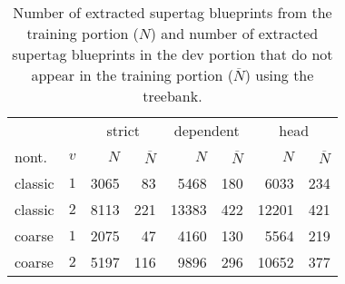\documentclass[../../document.tex]{subfiles}
\begin{document}
    \subsection{}
    \begin{table}
        \caption{\label{tbl:experiments:tiger:size}
        Number of extracted supertag blueprints from the training portion ($N$) and number of extracted supertag blueprints in the dev portion that do not appear in the training portion ($\overline{N}$) using the \tiger{} treebank.
        }
        \centering
        \setlength{\tabcolsep}{4pt}
        \vspace{.2cm}
        \begin{tabular}{lc|rr|rr|rr}
            \toprule     
            &        & \multicolumn{2}{c|}{strict} & \multicolumn{2}{c|}{dependent} & \multicolumn{2}{c}{head}  \\
  nont.   &\(v\)   & $N$ & $\overline{N}$ & $N$ & $\overline{N}$ & $N$ & $\overline{N}$ \\ \hline
   classic & \(1\)  & 3065 &  83 &  5468 & 180 &  6033 & 234  \\
   classic & \(2\)  & 8113 & 221 & 13383 & 422 & 12201 & 421   \\
   coarse  & \(1\)  & 2075 &  47 &  4160 & 130 &  5564 & 219      \\
   coarse  & \(2\)  & 5197 & 116 &  9896 & 296 & 10652 & 377  \\
    \bottomrule
        \end{tabular}
    \end{table}
\end{document}
